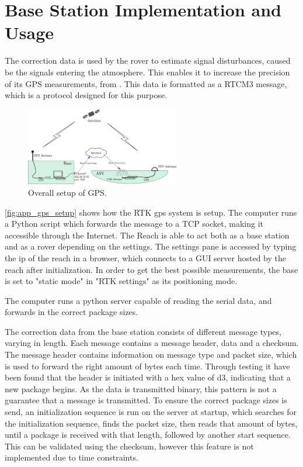 \section*{Base Station Implementation and Usage}
The correction data is used by the rover to estimate signal disturbances, caused be the signals entering the atmosphere. 
This enables it to increase the precision of its GPS measurements, from .
This data is formatted as a RTCM3 message, which is a protocol designed for this purpose.
\begin{figure}[H]
	\includegraphics[width=0.6\textwidth]{figures/comunicationSetup.pdf}
	\caption{Overall setup of GPS.}
	\label{fig:app_gps_setup}
\end{figure}
\autoref{fig:app_gps_setup} shows how the RTK gps system is setup. 
The computer runs a Python script which forwards the message to a TCP socket, making it accessible through the Internet. 
The Reach is able to act both as a base station and as a rover depending on the settings.
The settings pane is accessed by typing the ip of the reach in a browser, which connects to a GUI server hosted by the reach after initialization.
In order to get the best possible measurements, the base is set to "static mode" in "RTK settings" as its positioning mode.



The computer runs a python server capable of reading the serial data, and forwards in the correct package sizes.

The correction data from the base station consists of different message types, varying in length.
Each message contains a message header, data and a checksum. 
The message header contains information on message type and packet size, which is used to forward the right amount of bytes each time.
Through testing it have been found that the header is initiated with a hex value of d3, indicating that a new package begins. 
As the data is transmitted binary, this pattern is not a guarantee that a message is transmitted. 
To ensure the correct package sizes is send, an initialization sequence is run on the server at startup, which searches for the initialization sequence, finds the packet size, then reads that amount of bytes, until a package is received with that length, followed by another start sequence.
This can be validated using the checksum, however this feature is not implemented due to time constraints. 

